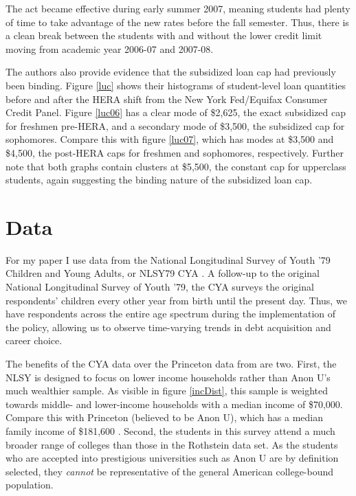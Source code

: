 \documentclass[12pt]{article}
\begin{document}
	The act became effective during early summer 2007, meaning students had plenty of time to take advantage of the new rates before the fall semester. Thus, there is a clean break between the students with and without the lower credit limit moving from academic year 2006-07 and 2007-08.
	
	The authors also provide evidence that the subsidized loan cap had previously been binding. Figure \ref{luc} shows their histograms of student-level loan quantities before and after the HERA shift from the New York Fed/Equifax Consumer Credit Panel. Figure \ref{luc06} has a clear mode of \$2,625, the exact subsidized cap for freshmen pre-HERA, and a secondary mode of \$3,500, the subsidized cap for sophomores. Compare this with figure \ref{luc07}, which has modes at \$3,500 and \$4,500, the post-HERA caps for freshmen and sophomores, respectively. Further note that both graphs contain clusters at \$5,500, the constant cap for upperclass students, again suggesting the binding nature of the subsidized loan cap. 
	
	
	\section{Data}
	
	For my paper I use data from the National Longitudinal Survey of Youth '79 Children and Young Adults, or NLSY79 CYA \parencite{bls2018}. A follow-up to the original National Longitudinal Survey of Youth '79, the CYA surveys the original respondents' children every other year from birth until the present day. Thus, we have respondents across the entire age spectrum during the implementation of the policy, allowing us to observe time-varying trends in debt acquisition and career choice. 
	
	The benefits of the CYA data over the Princeton data from \textcite{rothstein2011} are two. First, the NLSY is designed to focus on lower income households rather than Anon U's much wealthier sample. As visible in figure \ref{incDist}, this sample is weighted towards middle- and lower-income households with a median income of \$70,000. Compare this with Princeton (believed to be Anon U), which has a median family income of \$181,600 \parencite{aisch2017}. Second, the students in this survey attend a much broader range of colleges than those in the Rothstein data set. As the students who are accepted into prestigious universities such as Anon U are by definition selected, they \emph{cannot} be representative of the general American college-bound population. 
	
\end{document}
